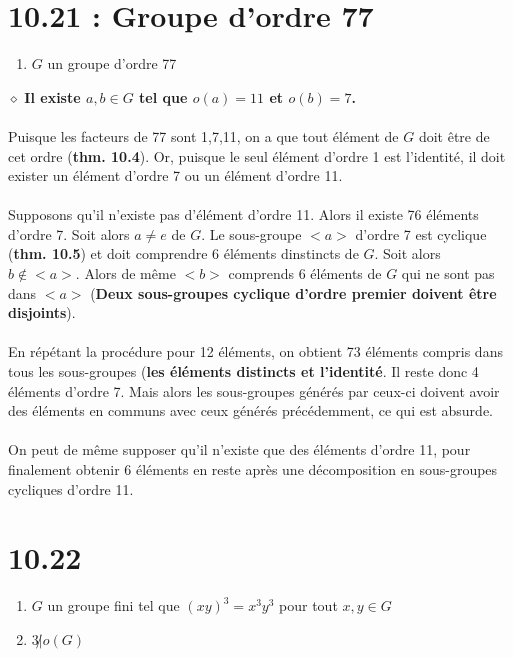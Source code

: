 \documentclass[a4paper,10pt]{article}
\begin{document}
\section*{10.21 : Groupe d'ordre 77}
\begin{enumerate}
 \item $G$ un groupe d'ordre 77
\end{enumerate}
$\diamond$ \textbf{Il existe $a,b \in G$ tel que $o(a) = 11$ et $o(b) = 7$.}
\\
\\
Puisque les facteurs de 77 sont 1,7,11, on a que tout élément de $G$ doit être de cet ordre (\textbf{thm. 10.4}). Or, puisque le
seul élément d'ordre 1 est l'identité, il doit exister un élément d'ordre 7 ou un élément d'ordre 11. 
\\
\\
Supposons qu'il n'existe pas d'élément d'ordre 11. Alors il existe 76 éléments d'ordre 7. Soit alors $a \not = e$ de $G$. Le sous-groupe
$<a>$ d'ordre 7 est cyclique (\textbf{thm. 10.5}) et doit comprendre 6 éléments dinstincts de $G$. Soit alors $b \not \in <a>$. Alors de même
$<b>$ comprends 6 éléments de $G$ qui ne sont pas dans $<a>$ (\textbf{Deux sous-groupes cyclique d'ordre premier doivent être disjoints}).
\\
\\
En répétant la procédure pour 12 éléments, on obtient 73 éléments compris dans tous les sous-groupes (\textbf{les éléments distincts 
et l'identité}. Il reste donc 4 éléments d'ordre 7. Mais alors les sous-groupes générés par ceux-ci doivent avoir des éléments en communs avec
ceux générés précédemment, ce qui est absurde. 
\\
\\
On peut de même supposer qu'il n'existe que des éléments d'ordre 11, pour finalement obtenir 6 éléments en reste après une décomposition en sous-groupes
cycliques d'ordre 11.

\section*{10.22}
\begin{enumerate}
 \item $G$ un groupe fini tel que $(xy)^3 = x^3 y^3$ pour tout $x,y \in G$
 \item $3 \not | o(G)$
\end{enumerate}
\end{document}
